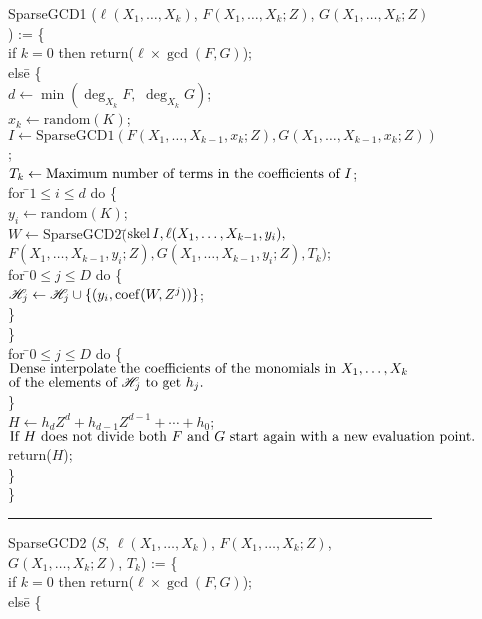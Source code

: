 \begin{figure}
\begindsacode
SparseGCD1 ($\ell(X_1, \ldots, X_k)$, $F(X_1, \ldots, X_k; Z)$, $G(X_1, \ldots, X_k; Z)$) := \{\\
\>if $k= 0$ then return($\ell \times \gcd(F, G)$); \\
\>els\=e \{ \\
\>\> $d \leftarrow \min(\deg_{X_k} F, \,\,\deg_{X_k} G)$; \\
\>\> $x_k \leftarrow \mbox{random}(K)$; \\
\>\> $I \leftarrow \mbox{SparseGCD1}(F(X_1, \ldots, X_{k-1}, x_k; Z),
G(X_1, \ldots, X_{k-1}, x_k; Z))$; \\
\>\> $T_k \leftarrow \mbox{\rm Maximum number of terms in the coefficients of $I$}$; \\
\>\> for \=$1 \le i \le d$ do \{ \\
\>\>\> $y_i \leftarrow \mbox{random}(K)$; \\
\>\>\> $W \leftarrow \mbox{SparseGCD2}($\=$\mathop{\rm skel}\nolimits I, \ell(X_1, \ldots, X_{k-1}, y_i),$ \\
\>\>\>\> $F(X_1, \ldots, X_{k-1}, y_i; Z), G(X_1, \ldots, X_{k-1}, y_i; Z), T_k)$;\\
\>\>\> for \=$0 \le j \le D$ do \{ \\
\>\>\>\> ${\cal H}_j \leftarrow {\cal H}_j \cup \{(y_i, \mathop{\rm coef}\nolimits(W, Z^j))\}$; \\
\>\>\>\> \} \\
\>\>\> \} \\
\>\> for \=$0 \le j \le D$ do \{ \\
\>\>\> $\mbox{\rm Dense interpolate the coefficients of the monomials in
$X_1, \ldots, X_k$}$\\
\>\>\> $\mbox{\rm of the elements of ${\cal H}_j$ to get $h_j$.}$\\
\>\>\> \} \\
\>\> $H \leftarrow h_d Z^d + h_{d-1} Z^{d-1} + \cdots + h_0$; \\
\>\> $\mbox{\rm If $H$ does not divide both $F$ and $G$ start again
with a new evaluation point.}$\\
\>\> return($H$); \\
\>\> \} \\
\> \}
\enddsacode
\hrule
\begindsacode
SparseGCD2 ($S$, $\ell(X_1, \ldots, X_k)$, $F(X_1, \ldots, X_{k}; Z)$, $G(X_1, \ldots, X_{k}; Z)$, $T_k$) := \{\\
\>if $k=0$ then return($\ell \times \gcd(F, G)$); \\
\>els\=e \{ \\

\end{figure}
